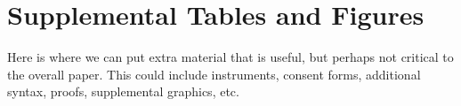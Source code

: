 \documentclass[11pt]{umnthesis}
\begin{document}
\begin{Shaded}
\begin{Highlighting}[]
             \NormalTok{(}\NormalTok{, }
                           \NormalTok{, } \NormalTok{), }
                          \NormalTok{))}
    
\NormalTok{  \}, }
   
\NormalTok{)}
\end{Highlighting}
\end{Shaded}

\hypertarget{appendix-b}{%
\chapter{Supplemental Tables and Figures}\label{appendix-b}}

Here is where we can put extra material that is useful, but perhaps not critical to the overall paper. This could include instruments, consent forms, additional syntax, proofs, supplemental graphics, etc.
\end{document}
